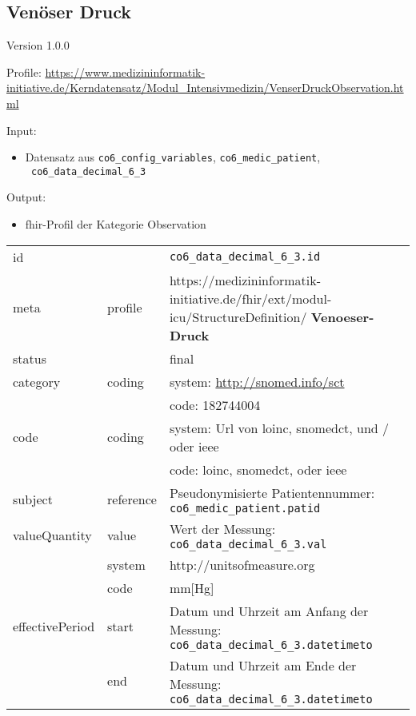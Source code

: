 \subsection{Venöser Druck} 
\noindent Version 1.0.0

\noindent Profile: \url{https://www.medizininformatik-initiative.de/Kerndatensatz/Modul_Intensivmedizin/VenserDruckObservation.html}

\noindent Input:
\begin{itemize}
	\item Datensatz aus \texttt{co6\_config\_variables}, \texttt{co6\_medic\_patient}, \\ \texttt{
co6\_data\_decimal\_6\_3}
\end{itemize}
Output:
\begin{itemize}
        \item \ac{fhir}-Profil der Kategorie \glqq Observation\grqq{}
\end{itemize}
\begin{longtable}{|l|l|p{7.5cm}|}
        \hline
        \rowcolor{lightgray} \multicolumn{3}{|l|}{Data Mapping (inhaltlich)} \\ \hline
        id &  & \texttt{co6\_data\_decimal\_6\_3.id} \\ \hline
	meta & profile & https://medizininformatik-initiative.de/fhir/ext/modul-icu/StructureDefinition/\textbf{
Venoeser-Druck} \\ \hline 
	status &  & final  \\ \hline 
	category & coding & system: \url{http://snomed.info/sct} \\
\cline{3-3}
	& & code: 182744004 \\ \hline
	code & coding & system: Url von \ac{loinc}, \ac{snomedct}, und / oder \ac{ieee} \\ 
	\cline{3-3} 
	 &  & code: \ac{loinc}, \ac{snomedct}, oder \ac{ieee} \\ \hline
	subject & reference & Pseudonymisierte Patientennummer: \texttt{co6\_medic\_patient.patid} \\ \hline
	valueQuantity & value & Wert der Messung: \texttt{
co6\_data\_decimal\_6\_3.val} \\
        \cline{2-3}
         & system & http://unitsofmeasure.org \\
         \cline{2-3}
         & code & mm[Hg] \\ \hline
    effectivePeriod & start & Datum und Uhrzeit am Anfang der Messung: \texttt{
co6\_data\_decimal\_6\_3.datetimeto} \\
    \cline{2-3}
     & end & Datum und Uhrzeit am Ende der Messung: \texttt{
co6\_data\_decimal\_6\_3.datetimeto} \\ \hline
\end{longtable}


